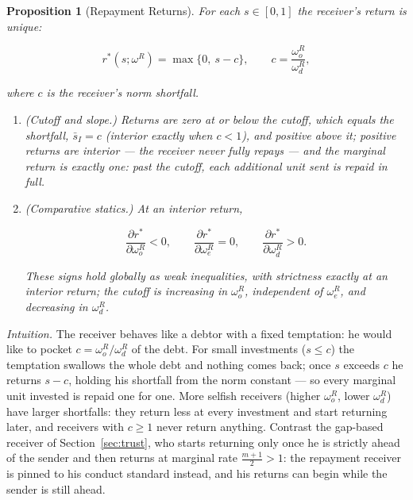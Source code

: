 \documentclass[11pt]{article}
\theoremstyle{plain}
\newtheorem{proposition}{Proposition}
\theoremstyle{remark}
\begin{document}
\begin{proposition}[Repayment Returns]
\label{prop:norm2_receiver}
For each $s\in[0,1]$ the receiver's return is unique:
\begin{csbox}
\[
        r^\ast(s;\omega^R)=\max\big\{0,\ s-c\big\},
        \qquad
        c=\frac{\omega_o^{R}}{\omega_d^{R}},
\]
\end{csbox}
where $c$ is the receiver's \emph{norm shortfall}.
\begin{enumerate}[topsep=2pt,itemsep=2pt]
\item \emph{(Cutoff and slope.)}  Returns are zero at or below the cutoff, which \emph{equals} the shortfall, $\bar s_I=c$ (interior exactly when $c<1$), and positive above it; positive returns are interior --- the receiver never fully repays --- and the marginal return is exactly one: past the cutoff, each additional unit sent is repaid in full.
\item \emph{(Comparative statics.)}  At an interior return,
\begin{csbox}
\[
        \frac{\partial r^\ast}{\partial \omega_o^{R}}<0,
        \qquad
        \frac{\partial r^\ast}{\partial \omega_e^{R}}=0,
        \qquad
        \frac{\partial r^\ast}{\partial \omega_d^{R}}>0.
\]
\end{csbox}
These signs hold globally as weak inequalities, with strictness exactly at an interior return; the cutoff is increasing in $\omega_o^{R}$, independent of $\omega_e^{R}$, and decreasing in $\omega_d^{R}$.
\end{enumerate}
\end{proposition}

\noindent\emph{Intuition.}  The receiver behaves like a debtor with a fixed temptation: he would like to pocket $c=\omega_o^{R}/\omega_d^{R}$ of the debt.  For small investments ($s\le c$) the temptation swallows the whole debt and nothing comes back; once $s$ exceeds $c$ he returns $s-c$, holding his shortfall from the norm constant --- so every marginal unit invested is repaid one for one.  More selfish receivers (higher $\omega_o^{R}$, lower $\omega_d^{R}$) have larger shortfalls: they return less at every investment and start returning later, and receivers with $c\ge1$ never return anything.  Contrast the gap-based receiver of Section~\ref{sec:trust}, who starts returning only once he is strictly ahead of the sender and then returns at marginal rate $\tfrac{m+1}2>1$: the repayment receiver is pinned to his conduct standard instead, and his returns can begin while the sender is still ahead.
\end{document}
